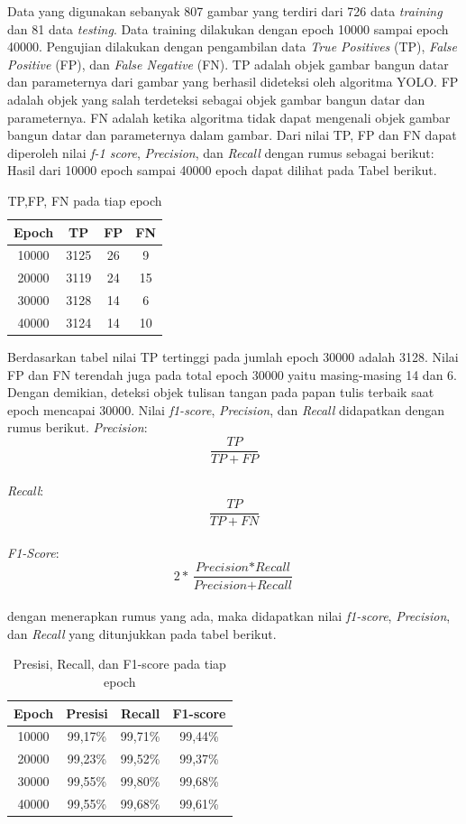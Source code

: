 Data yang digunakan sebanyak 807 gambar yang terdiri dari 726 data \textit{training} dan 81 data \textit{testing}. Data training dilakukan dengan epoch 10000 sampai epoch 40000. Pengujian dilakukan dengan pengambilan data \textit{True Positives} (TP), \textit{False Positive} (FP), dan \textit{False Negative} (FN). TP adalah objek gambar bangun datar dan parameternya dari gambar yang berhasil dideteksi oleh algoritma YOLO. FP adalah objek yang salah terdeteksi sebagai objek gambar bangun datar dan parameternya. FN adalah ketika algoritma tidak dapat mengenali objek gambar bangun datar dan parameternya dalam gambar. Dari nilai TP, FP dan FN dapat diperoleh nilai \textit{f-1 score}, \textit{Precision}, dan \textit{Recall} dengan rumus sebagai berikut: \\
Hasil dari 10000 epoch sampai 40000 epoch dapat dilihat pada Tabel berikut.

\begin{table}[H]
	\centering
	\begin{tabular}{c c c c} 
		\toprule
		Epoch & TP & FP & FN \\ [0.5ex] 
		\midrule
		10000 & 3125 & 26 & 9 \\ 
		\midrule
		20000 & 3119 & 24 & 15 \\
		\midrule
		30000 & 3128 & 14 & 6 \\
		\midrule
		40000 & 3124 & 14 & 10 \\ [1ex] 
		\bottomrule
	\end{tabular}
	\caption{TP,FP, FN pada tiap epoch}
\end{table}

Berdasarkan tabel nilai TP tertinggi pada jumlah epoch 30000 adalah 3128. Nilai FP dan FN terendah juga pada total epoch 30000 yaitu masing-masing 14 dan 6. Dengan demikian, deteksi objek tulisan tangan pada papan tulis terbaik saat epoch mencapai 30000. Nilai \textit{f1-score}, \textit{Precision}, dan \textit{Recall} didapatkan dengan rumus berikut.
\textit{Precision}: $$\frac{TP}{TP+FP}$$\\
\textit{Recall}: $$\frac{TP}{TP+FN}$$\\
\textit{F1-Score}: $$2*\frac{\textit{Precision}*\textit{Recall}}{\textit{Precision}+\textit{Recall}}$$\\
dengan menerapkan rumus yang ada, maka didapatkan nilai \textit{f1-score}, \textit{Precision}, dan \textit{Recall} yang ditunjukkan pada tabel berikut.
\begin{table}[H]
	\centering
	\begin{tabular}{c c c c}
		\toprule
		Epoch & Presisi & Recall  & F1-score \\
		\midrule
		10000 & 99,17\% & 99,71\% & 99,44\%  \\
		\midrule
		20000 & 99,23\% & 99,52\% & 99,37\%  \\
		\midrule
		30000 & 99,55\% & 99,80\% & 99,68\%  \\
		\midrule
		40000 & 99,55\% & 99,68\% & 99,61\% \\
		\bottomrule
	\end{tabular}
	\caption{Presisi, Recall, dan F1-score pada tiap epoch}
\end{table}